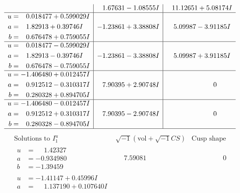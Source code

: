 \documentclass[1p]{elsarticle_modified}
\theoremstyle{definition}
\newcommand{\I}{\sqrt{-1}}
\begin{document}
$$\begin{array}{c|c|c}
 & \phantom{-}1.67631 - 1.08555 I & \phantom{-}11.12651 + 5.08174 I \\ \hline\begin{aligned}
u &= \phantom{-}0.018477 + 0.599029 I \\
a &= \phantom{-}1.82913 + 0.39746 I \\
b &= \phantom{-}0.676478 + 0.759055 I\end{aligned}
 & -1.23861 + 3.38808 I & \phantom{-}5.09987 - 3.91185 I \\ \hline\begin{aligned}
u &= \phantom{-}0.018477 - 0.599029 I \\
a &= \phantom{-}1.82913 - 0.39746 I \\
b &= \phantom{-}0.676478 - 0.759055 I\end{aligned}
 & -1.23861 - 3.38808 I & \phantom{-}5.09987 + 3.91185 I \\ \hline\begin{aligned}
u &= -1.406480 + 0.012457 I \\
a &= \phantom{-}0.912512 - 0.310317 I \\
b &= \phantom{-}0.280328 + 0.894705 I\end{aligned}
 & \phantom{-}7.90395 + 2.90748 I & \phantom{-0.000000 } 0 \\ \hline\begin{aligned}
u &= -1.406480 - 0.012457 I \\
a &= \phantom{-}0.912512 + 0.310317 I \\
b &= \phantom{-}0.280328 - 0.894705 I\end{aligned}
 & \phantom{-}7.90395 - 2.90748 I & \phantom{-0.000000 } 0\\
 \hline 
 \end{array}$$\newpage$$\begin{array}{c|c|c}  
\text{Solutions to }I^u_{1}& \I (\text{vol} + \sqrt{-1}CS) & \text{Cusp shape}\\
 \hline 
\begin{aligned}
u &= \phantom{-}1.42327\phantom{ +0.000000I} \\
a &= -0.934980\phantom{ +0.000000I} \\
b &= -1.39459\phantom{ +0.000000I}\end{aligned}
 & \phantom{-}7.59081\phantom{ +0.000000I} & \phantom{-0.000000 } 0 \\ \hline\begin{aligned}
u &= -1.41147 + 0.45996 I \\
a &= \phantom{-}1.137190 + 0.107640 I \\

\end{aligned}
\end{array}$$
\end{document}
